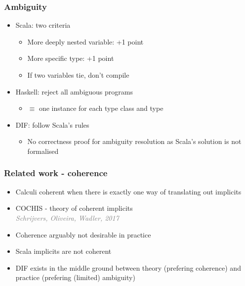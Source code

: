 \begin{frame}
    \frametitle{Ambiguity}
    \begin{itemize}
        \pause \item Scala: two criteria
        \begin{itemize}
            \pause \item More deeply nested variable: +1 point
            \pause \item More specific type: +1 point
            \pause \item If two variables tie, don't compile
        \end{itemize}
        \pause \item Haskell: reject all ambiguous programs
        \begin{itemize}
            \pause \item $\equiv$ one instance for each type class and type
        \end{itemize}
        \pause \item DIF: follow Scala's rules
        \begin{itemize}
            \pause \item No correctness proof for ambiguity resolution as
                Scala's solution is not formalised
        \end{itemize}
    \end{itemize}
\end{frame}

\begin{frame}
    \frametitle{Related work - coherence}
    \begin{itemize}
        \pause \item Calculi coherent when there is exactly one way of
            translating out implicits
        \pause \item COCHIS - theory of coherent implicits \\
            \textcolor{grey}{\emph{Schrijvers, Oliveira, Wadler, 2017}}
        \pause \item Coherence arguably not desirable in practice
        \pause \item Scala implicits are not coherent
        \pause \item DIF exists in the middle ground between theory (prefering
            coherence) and practice (prefering (limited) ambiguity)
    \end{itemize}
\end{frame}

